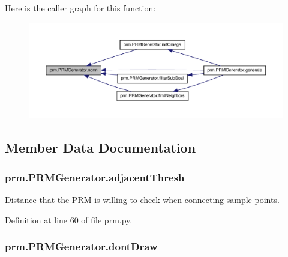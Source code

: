 Here is the caller graph for this function\-:\nopagebreak
\begin{figure}[H]
\begin{center}
\leavevmode
\includegraphics[width=350pt]{classprm_1_1PRMGenerator_a652b3c0fa11645f351c23635d7e62dda_icgraph}
\end{center}
\end{figure}




\subsection{Member Data Documentation}
\hypertarget{classprm_1_1PRMGenerator_aa56ad4365534ffed0b4311c5accce577}{
\subsubsection[{adjacent\-Thresh}]{\setlength{\rightskip}{0pt plus 5cm}prm.\-P\-R\-M\-Generator.\-adjacent\-Thresh}}\label{classprm_1_1PRMGenerator_aa56ad4365534ffed0b4311c5accce577}


Distance that the P\-R\-M is willing to check when connecting sample points. 



Definition at line 60 of file prm.\-py.

\hypertarget{classprm_1_1PRMGenerator_a6a92750aa0e081cc87c64e157b0ecb53}{
\subsubsection[{dont\-Draw}]{\setlength{\rightskip}{0pt plus 5cm}prm.\-P\-R\-M\-Generator.\-dont\-Draw}}\label{classprm_1_1PRMGenerator_a6a92750aa0e081cc87c64e157b0ecb53}


